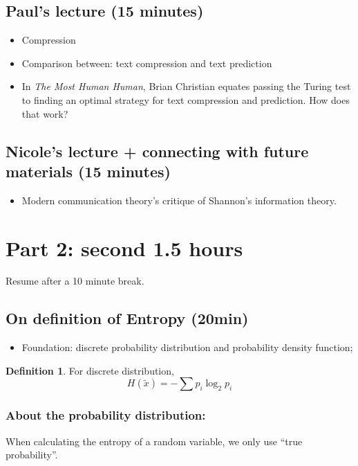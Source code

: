 \documentclass[12pt]{article}
\theoremstyle{definition}
\newtheorem{definition}[theorem]{Definition}
\theoremstyle{plain}
\begin{document}
\subsection{Paul's lecture (15 minutes)}
\begin{itemize}
    \item Compression
    \item Comparison between: text compression and text prediction
    \item In \emph{The Most Human Human}, Brian Christian equates passing the Turing test to finding an optimal strategy for text compression and prediction. How does that work?
\end{itemize}

\subsection{Nicole's lecture + connecting with future materials (15 minutes)}
\begin{itemize}
    \item Modern communication theory's critique of Shannon's information
        theory.
\end{itemize}

\section{Part 2: second 1.5 hours}
Resume after a 10 minute break.
\subsection{On definition of Entropy (20min) }
        \begin{itemize}
            \item Foundation: discrete probability distribution and probability density function;
        \end{itemize}
\begin{definition}
    For discrete distribution,
    \[
        H(\tilde x) = - \sum p_i \log_{2} p_i
    \]
\end{definition}

\subsubsection{About the probability distribution:}
When calculating the entropy of a random variable, we only use ``true
probability''.

\end{document}
